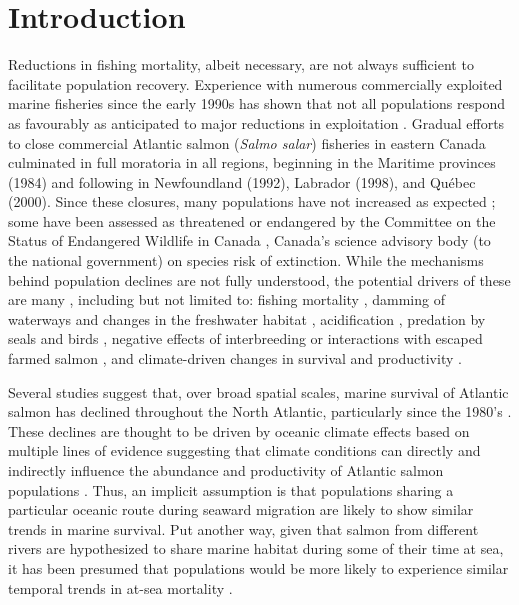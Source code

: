 \documentclass[12pt]{article}
\begin{document}

\section*{Introduction} %


Reductions in fishing mortality, albeit necessary, are not always sufficient
to facilitate population recovery. Experience with numerous commercially
exploited marine fisheries since the early 1990s has shown that not all
populations respond as favourably as anticipated to major reductions in
exploitation \citep{Hutchings2017}. Gradual efforts to close commercial
Atlantic salmon (\emph{Salmo salar}) fisheries in eastern Canada culminated in
full moratoria in all regions, beginning in the Maritime provinces (1984) and
following in Newfoundland (1992), Labrador (1998), and Qu\'{e}bec (2000). Since
these closures, many populations have not increased as
expected \citep{Dempson2004, ICES2019}; some
have been assessed as threatened or endangered by the
Committee on the Status of Endangered Wildlife in Canada \citep[][]{Cosewic2010},
Canada's science advisory body (to the national government) on
species risk of extinction.
While the mechanisms behind population declines are not fully understood, the potential
drivers of these are many \citep[see ][for a detailed discussion of possible
causes]{Cairns2001}, including but not limited to: fishing mortality \citep{Dempson2004},
damming of waterways and changes in the freshwater habitat \citep{Dunfield1985,Clarke2014a},
acidification \citep[particularly in Nova Scotia's Southern Uplands, see][]{Gibson2010},
predation by seals and birds \citep{Cairns2000}, negative
effects of interbreeding or interactions with escaped farmed salmon
\citep{Keyser2018}, and climate-driven changes in survival and productivity \citep{Mills2013}.

Several studies suggest that, over broad spatial scales,
marine survival of Atlantic salmon has declined throughout the North Atlantic,
particularly since the 1980's \citep{Massiot-Granier2014,ICES2019,Olmos2019}.
These declines are thought to be driven by oceanic climate effects
based on multiple lines of evidence suggesting that climate conditions can directly and
indirectly influence the abundance and productivity of Atlantic salmon
populations \citep{Mills2013,Almodovar2019,Olmos2020}.
Thus, an implicit assumption is that populations sharing a particular oceanic
route during seaward migration are likely to show similar trends in marine
survival.
Put another way, given that salmon from different rivers
are hypothesized to share marine habitat during some of their time at sea, it
has been presumed that populations would be more likely to experience similar temporal trends in
at-sea mortality \citep{Friedland1993, Friedland1998, Russell2012}.
\end{document}
